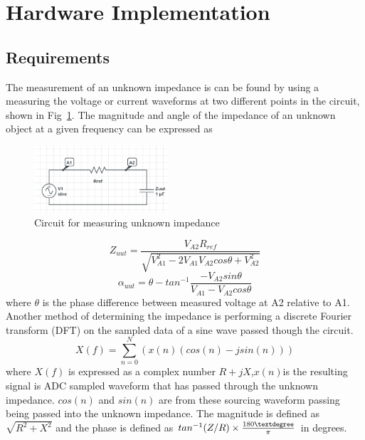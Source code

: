 \documentclass[]{IEEEtran}
\begin{document}
\section{Hardware Implementation}
\subsection{Requirements}
The measurement of an unknown impedance is can be found by using a measuring the voltage or current waveforms at two different points in the circuit, shown in Fig~\ref{fig:zun}\cite{noauthor_oscilloscope_nodate}. The magnitude and angle of the impedance of an unknown object at a given frequency can be expressed as

\begin{figure} %
\centering
\includegraphics[width=5cm ]{./graphics/zun.png}
\centering
\caption{Circuit for measuring unknown impedance}
\label{fig:zun}
\end{figure}


\[Z_{uut}=\frac{V_{A2}R_{ref}}{\sqrt{V^2_{A1}-2V_{A1}V_{A2}cos\theta+V^2_{A2}}}\]
\newline
\[\alpha_{uut}=\theta-tan^{-1}\frac{-V_{A2}sin\theta}{V_{A1}-V_{A2}cos\theta} \]
where \(\theta\) is the phase difference between measured voltage at A2 relative to A1.
\newline
Another method of determining the impedance is performing a discrete Fourier transform (DFT) on the sampled data of a sine wave passed though the circuit.
\[X(f)=\sum_{n=0}^{N}(x(n)(cos(n)-jsin(n)))\]
where \(X(f)\) is expressed as a complex number \(R+jX\),\(x(n)\)is the resulting signal is ADC sampled waveform that has passed through the unknown impedance. \(cos(n)\) and \(sin(n)\) are from these sourcing waveform passing being passed into the unknown impedance. The magnitude is defined as \(\sqrt{R^2+X^2}\) and the phase is defined as \(tan^{-1}(Z/R)\times\frac{180\textdegree}{\pi}\) in degrees\cite{noauthor_ad5933_nodate}.
\end{document}
